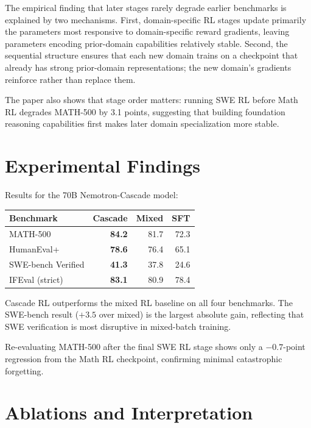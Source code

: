 \documentclass[10pt,twocolumn]{article}
\begin{document}
The empirical finding that later stages rarely degrade earlier benchmarks is explained by two mechanisms.
First, domain-specific RL stages update primarily the parameters most responsive to domain-specific reward gradients, leaving parameters encoding prior-domain capabilities relatively stable.
Second, the sequential structure ensures that each new domain trains on a checkpoint that already has strong prior-domain representations; the new domain's gradients reinforce rather than replace them.

The paper also shows that stage order matters: running SWE RL before Math RL degrades MATH-500 by 3.1 points, suggesting that building foundation reasoning capabilities first makes later domain specialization more stable.

\section{Experimental Findings}

Results for the 70B Nemotron-Cascade model:

\begin{center}
\small
\begin{tabular}{lrrr}
\toprule
\textbf{Benchmark} & \textbf{Cascade} & \textbf{Mixed} & \textbf{SFT} \\
\midrule
MATH-500 & \textbf{84.2} & 81.7 & 72.3 \\
HumanEval+ & \textbf{78.6} & 76.4 & 65.1 \\
SWE-bench Verified & \textbf{41.3} & 37.8 & 24.6 \\
IFEval (strict) & \textbf{83.1} & 80.9 & 78.4 \\
\bottomrule
\end{tabular}
\end{center}

Cascade RL outperforms the mixed RL baseline on all four benchmarks.
The SWE-bench result ($+3.5$ over mixed) is the largest absolute gain, reflecting that SWE verification is most disruptive in mixed-batch training.

Re-evaluating MATH-500 after the final SWE RL stage shows only a $-0.7$-point regression from the Math RL checkpoint, confirming minimal catastrophic forgetting.

\section{Ablations and Interpretation}
\end{document}
